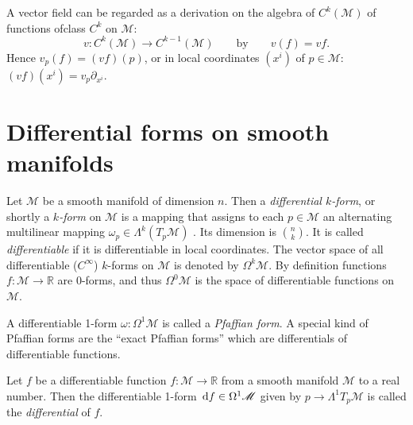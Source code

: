 \begin{bem}
	\label{bem:vector-field-as-a-derivation-on-C^k(M)}
	A vector field can be regarded as a derivation on the algebra of $C^k(\mathscr{M})$ of functions ofclass $C^k$ on $\mathscr{M}$:
	\begin{equation}
		 v: C^k(\mathscr{M}) \to C^{k-1}(\mathscr{M})
		 \qquad
		 \mbox{by}
		 \qquad
		 v(f) = vf.
	\end{equation}
	Hence $v_p(f) = (vf)(p)$, or in local coordinates $(x^i)$ of $p \in \mathscr{M}$:
	$ %
		(vf)(x^i)
		= v_p \partial_{x^i}.
	$ %
\end{bem}


\section{Differential forms on smooth manifolds}

\begin{definition}
	\cite[219]{Jaenich-2002}
	Let $\mathscr{M}$ be a smooth manifold of dimension $n$.
	Then a \emph{differential $k$-form},
	or shortly a \emph{$k$-form} on $\mathscr{M}$ is a mapping that assigns to each $p \in \mathscr{M}$
	an alternating multilinear mapping $\omega_p \in \Lambda^k (T_p \mathscr{M})$ \cite[cf.][217]{Jaenich-2001}.
	Its dimension is $\binom{n}{k}$.
	It is called \emph{differentiable} if it is differentiable in local coordinates.
	The vector space of all differentiable ($C^\infty$) $k$-forms on $\mathscr{M}$ is denoted by
	$\Omega ^k \mathscr{M}$.
	By definition functions $f: \mathscr{M} \to \mathbb{R}$ are 0-forms, and thus $\Omega^0 \mathscr{M}$ is the space of differentiable functions on $\mathscr{M}$.
\end{definition}

A differentiable 1-form $\omega: \Omega^1 \mathscr{M}$ is called a \emph{Pfaffian form}. A special kind of Pfaffian forms are the “exact Pfaffian forms” which are differentials of differentiable functions.

\begin{definition}
\cite[60]{Jaenich-1992}
Let $f$ be a differentiable function $f:\mathscr{M} \to \mathbb{R}$ from a smooth manifold $\mathscr{M}$ to a real number. Then the differentiable 1-form $\,\mathrm{d} f \in \Omega^1 \mathscr{M}$ given by $p \to \Lambda^1 T_p \mathscr{M}$ is called the \emph{differential} of $f$.
\end{definition}

